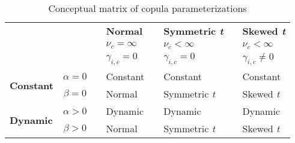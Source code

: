 
\begin{table}
  \centering
  \footnotesize
  \renewcommand{\arraystretch}{1.2}

  \caption{Conceptual matrix of copula parameterizations}

  \begin{tabularx}{0.80\textwidth}{@{} lc c >{\centering}Xc >{\centering}Xc >{\centering\arraybackslash}X}
    \toprule
      & && \textbf{Normal} && \textbf{Symmetric \emph{t}} && \textbf{Skewed \emph{t}} \\
      \cmidrule{4-4}
      \cmidrule{6-6}
      \cmidrule{8-8}
      & && $\nu_c = \infty$   && $\nu_c < \infty$   && $\nu_c < \infty$ \\
      & && $\gamma_{i,c} = 0$ && $\gamma_{i,c} = 0$ && $\gamma_{i,c} \neq 0$ \\
      \cmidrule{4-8}
    \cmidrule{1-2}
    \multirow{2}{*}{\textbf{Constant}} & $\alpha = 0$ && Constant && Constant && Constant \\
                              & $\beta = 0$  && Normal   && Symmetric \emph{t} && Skewed \emph{t}      \\
    \cmidrule{1-2}
    \multirow{2}{*}{\textbf{Dynamic}}  & $\alpha > 0$ && Dynamic  && Dynamic && Dynamic \\
                              & $\beta > 0$  && Normal   && Symmetric \emph{t} && Skewed \emph{t}      \\
    \bottomrule
  \end{tabularx}

\end{table}
